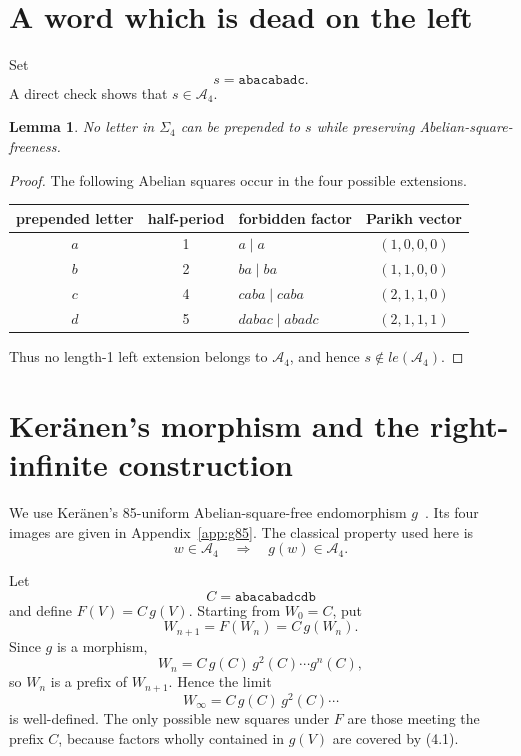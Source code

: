 \documentclass[11pt]{article}
\newtheorem{lemma}[theorem]{Lemma}
\theoremstyle{definition}
\newcommand{\A}{\mathcal A_4}
\newcommand{\code}[1]{\texttt{#1}}
\begin{document}
\section{A word which is dead on the left}

Set
\[
s=\code{abacabadc}.
\]
A direct check shows that $s\in\A$.

\begin{lemma}
No letter in $\Sigma_4$ can be prepended to $s$ while preserving Abelian-square-freeness.
\end{lemma}

\begin{proof}
The following Abelian squares occur in the four possible extensions.

\begin{center}
\begin{tabular}{cclc}
\toprule
prepended letter & half-period & forbidden factor & Parikh vector\\
\midrule
$a$ & 1 & $a\mid a$ & $(1,0,0,0)$\\
$b$ & 2 & $ba\mid ba$ & $(1,1,0,0)$\\
$c$ & 4 & $caba\mid caba$ & $(2,1,1,0)$\\
$d$ & 5 & $dabac\mid abadc$ & $(2,1,1,1)$\\
\bottomrule
\end{tabular}
\end{center}
Thus no length-1 left extension belongs to $\A$, and hence $s\notin le(\A)$.
\end{proof}

\section{Ker\"anen's morphism and the right-infinite construction}

We use Ker\"anen's 85-uniform Abelian-square-free endomorphism $g$~\cite{Keranen1992}. Its four images are given in Appendix~\ref{app:g85}. The classical property used here is
\[
w\in\A\quad\Longrightarrow\quad g(w)\in\A.
\tag{4.1}
\]

Let
\[
C=\code{abacabadcdb}
\]
and define $F(V)=C\,g(V)$. Starting from $W_0=C$, put
\[
W_{n+1}=F(W_n)=C\,g(W_n).
\]
Since $g$ is a morphism,
\[
W_n=C\,g(C)\,g^2(C)\cdots g^n(C),
\tag{4.2}
\]
so $W_n$ is a prefix of $W_{n+1}$. Hence the limit
\[
W_\infty=C\,g(C)\,g^2(C)\cdots
\tag{4.3}
\]
is well-defined. The only possible new squares under $F$ are those meeting the prefix $C$, because factors wholly contained in $g(V)$ are covered by (4.1).
\end{document}
